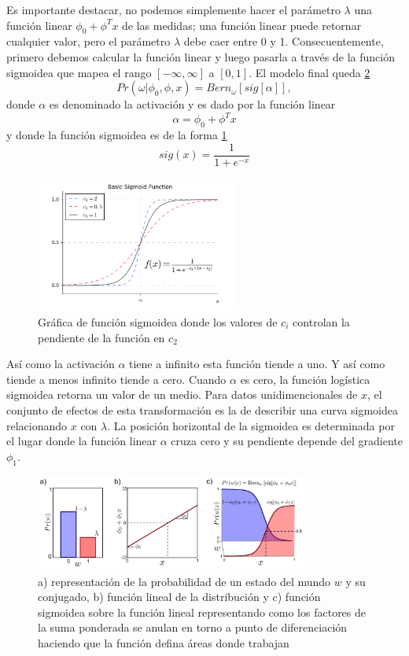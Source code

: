 \documentclass[letter,12pt]{report}
\begin{document}
Es importante destacar, no podemos simplemente hacer el parámetro $\lambda$ una función
linear $\phi_0+\phi^Tx$ de las medidas; una función linear puede retornar cualquier
valor, pero el parámetro $\lambda$ debe caer entre 0 y 1. Consecuentemente, primero
debemos calcular la función linear y luego pasarla a través de la función sigmoidea que
mapea el rango $[-\infty,\infty]$ a $[0, 1]$. El modelo final queda \ref{fig:logistic}
$$Pr(\omega|\phi_0, \phi, x)=Bern_\omega [sig[\alpha]],$$
donde $\alpha$ es denominado la activación y es dado por la función linear
$$\alpha=\phi_0+\phi^Tx$$
y donde la función sigmoidea \cite{Sigmoid} es de la forma \ref{fig:sigmoid}
$$sig(x)=\frac{1}{1 + e^{-x}}$$

\begin{figure}[H]
    \centering
    \includegraphics[width=0.6\textwidth]{sigmoid}
\caption{Gráfica de función sigmoidea donde los valores de $c_i$ controlan la pendiente
de la función en $c_2$}
    \label{fig:sigmoid}
\end{figure}

Así como la activación $\alpha$ tiene a infinito esta función tiende a uno. Y así como
tiende a menos infinito tiende a cero. Cuando $\alpha$ es cero, la función logística
sigmoidea retorna un valor de un medio. Para datos unidimencionales de $x$, el conjunto
de efectos de esta transformación es la de describir una curva sigmoidea relacionando $x$
con $\lambda$. La posición horizontal de la sigmoidea es determinada por el lugar donde
la función linear $\alpha$ cruza cero y su pendiente depende del gradiente $\phi_1$.

\begin{figure}[H]
    \centering
    \includegraphics[width=0.8\textwidth]{logistic}
    \caption{a) representación de la probabilidad de un estado del mundo $w$ y su
    conjugado, b) función lineal de la distribución y c) función sigmoidea sobre la
función lineal representando como los factores de la suma ponderada se anulan en torno a
punto de diferenciación haciendo que la función defina áreas donde trabajan}
    \label{fig:logistic}
\end{figure}
\end{document}
